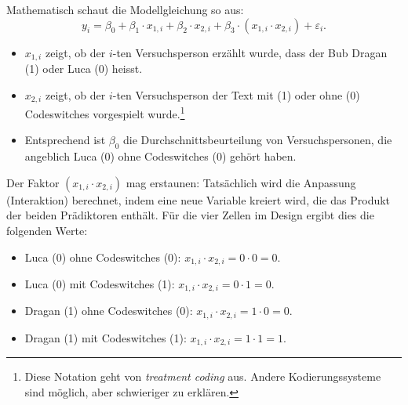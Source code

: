 \documentclass[oneside, 10pt]{book}\usepackage[]{graphicx}\usepackage[]{xcolor}
\begin{document}
Mathematisch schaut die Modellgleichung so aus:
\[
  y_i = \beta_0 + \beta_1 \cdot x_{1,i} + \beta_2 \cdot x_{2,i} + \beta_3 \cdot (x_{1,i} \cdot x_{2,i}) + \varepsilon_i.
\]
\begin{itemize}
 \item $x_{1,i}$ zeigt, ob der $i$-ten Versuchsperson erzählt wurde, dass der Bub Dragan (1) oder Luca (0) heisst.
 \item $x_{2,i}$ zeigt, ob der $i$-ten Versuchsperson der Text mit (1) oder ohne (0) Codeswitches vorgespielt wurde.\footnote{Diese Notation
geht von \textit{treatment coding} aus. Andere Kodierungssysteme sind möglich, aber schwieriger zu erklären.}
 \item Entsprechend ist $\beta_0$ die Durchschnittsbeurteilung von Versuchspersonen, die angeblich Luca (0) ohne Codeswitches (0) gehört haben.
\end{itemize}

Der Faktor $(x_{1,i} \cdot x_{2,i})$ mag erstaunen: Tatsächlich wird die Anpassung (Interaktion)
berechnet, indem eine neue Variable kreiert wird, die das Produkt der beiden Prädiktoren enthält.
Für die vier Zellen im Design ergibt dies die folgenden Werte:
\begin{itemize}
 \item Luca (0) ohne Codeswitches (0): $x_{1,i} \cdot x_{2,i} = 0 \cdot 0 = 0$.
 \item Luca (0) mit Codeswitches (1): $x_{1,i} \cdot x_{2,i} = 0 \cdot 1 = 0$.
 \item Dragan (1) ohne Codeswitches (0): $x_{1,i} \cdot x_{2,i} = 1 \cdot 0 = 0$.
 \item Dragan (1) mit Codeswitches (1): $x_{1,i} \cdot x_{2,i} = 1 \cdot 1 = 1$.
\end{itemize}
\end{document}
